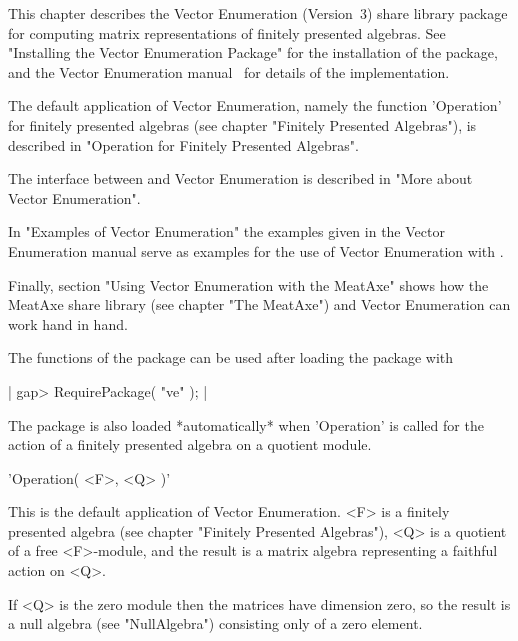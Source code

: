 \def\VE{Vector Enumeration}
\def\MeatAxe{\sf MeatAxe}

This chapter describes the {\VE} (Version~3) share library package for
computing matrix representations of finitely presented algebras.  See
"Installing the Vector Enumeration Package" for the installation of the
package, and the {\VE} manual~\cite{Lin93} for details of the
implementation.

The default application of {\VE}, namely the function 'Operation' for
finitely presented algebras (see chapter "Finitely Presented Algebras"),
is described in "Operation for Finitely Presented Algebras".

The interface between {\GAP} and {\VE} is described in "More about Vector
Enumeration".

In "Examples of Vector Enumeration" the examples given in the {\VE} manual
serve as examples for the use of {\VE} with {\GAP}.

Finally, section "Using Vector Enumeration with the MeatAxe" shows how
the {\MeatAxe} share library (see chapter "The MeatAxe") and {\VE} can work
hand in hand.

The functions of the package can be used after loading the package with

|    gap> RequirePackage( "ve" ); |

The package is also loaded *automatically* when 'Operation' is called for the
action of a finitely presented algebra on a quotient module.


'Operation( <F>, <Q> )'

This is the default application of {\VE}.
<F> is a finitely presented algebra (see chapter "Finitely Presented
Algebras"), <Q> is a quotient of a free <F>-module,
and the result is a matrix algebra representing a faithful action on <Q>.

If <Q> is the zero module then the matrices have dimension zero, so the
result is a null algebra (see "NullAlgebra") consisting only of a zero
element.

